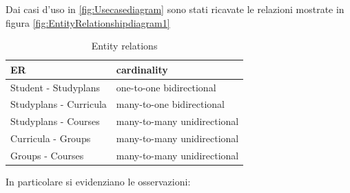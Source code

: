 \documentclass{article}
\begin{document}
Dai casi d'uso in \ref{fig:Usecasediagram} sono stati ricavate le relazioni mostrate in figura \ref{fig:EntityRelationshipdiagram1}
\begin{table}[!h]
  \begin{center}
    \caption{Entity relations}
    \label{tab:Entity Relationship}
    \begin{tabular}{l|l} %
      \textbf{ER} & \textbf{cardinality}  \\ 
      \hline
		Student - Studyplans & one-to-one bidirectional \\
		Studyplans - Curricula & many-to-one bidirectional \\
		Studyplans - Courses  & many-to-many unidirectional \\
		Curricula - Groups & many-to-many unidirectional \\
		Groups - Courses & many-to-many unidirectional \\
    \end{tabular}
  \end{center}
\end{table}
In particolare si evidenziano le osservazioni:
\end{document}
